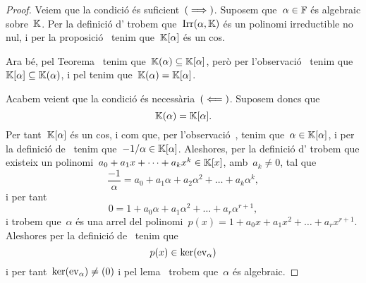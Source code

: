 \documentclass[../../main.tex]{subfiles}
\begin{document}
    \begin{proof} %
        Veiem que la condició és suficient~\((\implies)\).
        Suposem que~\(\alpha\in\mathbb{F}\) és algebraic sobre~\(\mathbb{K}\).
        Per la definició d' trobem que~\(\operatorname{Irr}(\alpha,\mathbb{K})\) és un polinomi irreductible no nul, i per la proposició~ tenim que~\(\mathbb{K}[\alpha]\) és un cos.

        Ara bé, pel Teorema~ tenim que~\(\mathbb{K}(\alpha)\subseteq\mathbb{K}[\alpha]\), però per l'observació~ tenim que~\(\mathbb{K}[\alpha]\subseteq\mathbb{K}(\alpha)\), i pel  tenim que~\(\mathbb{K}(\alpha)=\mathbb{K}[\alpha]\).

        Acabem veient que la condició és necessària~\((\impliedby)\).
        Suposem doncs que
        \[
            \mathbb{K}(\alpha)=\mathbb{K}[\alpha].
        \]
        Per tant~\(\mathbb{K}[\alpha]\) és un cos, i com que, per l'observació~, tenim que~\(\alpha\in\mathbb{K}[\alpha]\), i per la definició de~ tenim que~\(-1/\alpha\in\mathbb{K}[\alpha]\).
        Aleshores, per la definició d' trobem que existeix un polinomi~\(a_{0}+a_{1}x+\dots+a_{k}x^{k}\in\mathbb{K}[x]\), amb~\(a_{k}\neq0\), tal que
        \[
            \frac{-1}{\alpha}=a_{0}+a_{1}\alpha+a_{2}\alpha^{2}+\dots+a_{k}\alpha^{k},
        \]
        i per tant
        \[
            0=1+a_{0}\alpha+a_{1}\alpha^{2}+\dots+a_{r}\alpha^{r+1},
        \]
        i trobem que~\(\alpha\) és una arrel del polinomi~\(p(x)=1+a_{0}x+a_{1}x^{2}+\dots+a_{r}x^{r+1}\).
        Aleshores per la definició de~ tenim que
        \[
            p(x)\in\operatorname{ker}(\mathrm{ev}_{\alpha})
        \]
        i per tant~\(\operatorname{ker}(\mathrm{ev}_{\alpha})\neq(0)\) i pel lema~ trobem que~\(\alpha\) és algebraic.
    \end{proof}
\end{document}
